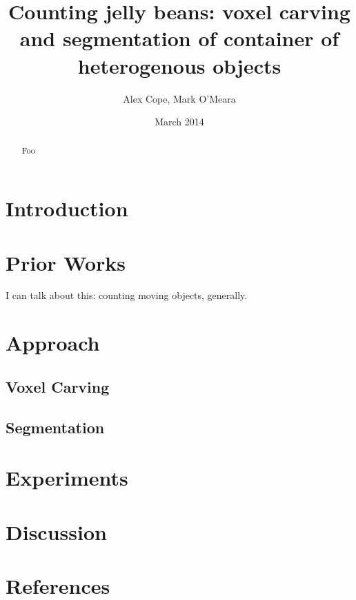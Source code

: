 \documentclass[12pt]{article}
\begin{document}
\title{Counting jelly beans: voxel carving and segmentation of container of heterogenous objects}
\author{Alex Cope, Mark O'Meara}
\date{March 2014}
\maketitle

\begin{abstract}

Foo

\end{abstract}

\section{Introduction}

\section{Prior Works}

I can talk about this: counting moving objects, generally.

\section{Approach}

\subsection{Voxel Carving}

\subsection{Segmentation}

\section{Experiments}

\section{Discussion}

\section{References}
\end{document}

